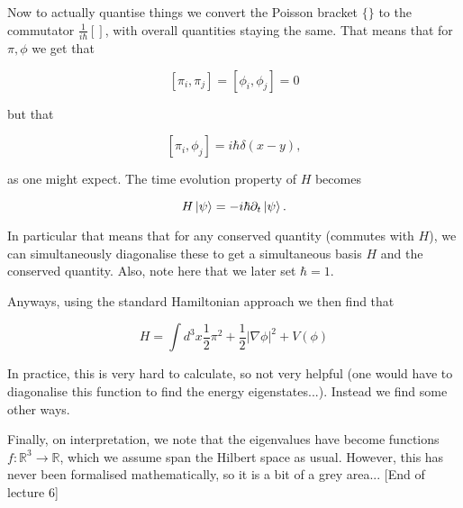 \documentclass{article}
\theoremstyle{definition}
\begin{document}
Now to actually quantise things we convert the Poisson bracket $\{\}$ to the
commutator $\frac{1}{i\hbar} []$, with overall quantities staying the same. That
means that for $\pi, \phi$ we get that

$$ [\pi_i, \pi_j] = [\phi_i, \phi_j] = 0$$

but that

$$ [ \pi_i, \phi_j] = i\hbar \delta(x - y), $$

as one might expect. The time evolution property of $H$ becomes 

$$ H \ket{\psi} = -i \hbar \partial_t \ket{\psi}. $$

In particular that means that for any conserved quantity (commutes with $H$), we
can simultaneously diagonalise these to get a simultaneous basis $H$ and the
conserved quantity. Also, note here that we later set $\hbar = 1$.

Anyways, using the standard Hamiltonian approach we then find that

$$ H = \int d^3x \frac{1}{2} \pi^2 + \frac{1}{2} |\nabla \phi|^2 + V(\phi) $$

In practice, this is very hard to calculate, so not very helpful (one would have
to diagonalise this function to find the energy eigenstates...). Instead we find
some other ways.

Finally, on interpretation, we note that the eigenvalues have become functions
$f : \mathbb{R}^3 \to \mathbb{R}$, which we assume span the Hilbert space as
usual. However, this has never been formalised mathematically, so it is a bit of
a grey area... [End of lecture 6]
\end{document}

